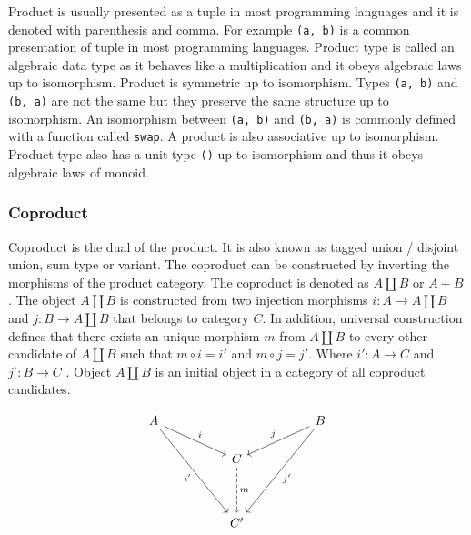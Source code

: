\documentclass[article]{aaltoseries}
\begin{document}
    Product is usually presented as a tuple in most programming languages and it
    is denoted with parenthesis and comma. For example \lstinline|(a, b)| is a
    common presentation of tuple in most programming languages. Product type is
    called an algebraic data type as it behaves like a multiplication and it
    obeys algebraic laws up to isomorphism. Product is symmetric up to
    isomorphism. Types \lstinline|(a, b)| and \lstinline|(b, a)| are not the
    same but they preserve the same structure up to isomorphism. An isomorphism
    between \lstinline|(a, b)| and \lstinline|(b, a)| is commonly defined with a
    function called \lstinline|swap|. A product is also associative up to
    isomorphism. Product type also has a unit type \lstinline|()| up to
    isomorphism and thus it obeys algebraic laws of monoid.


  \subsubsection{Coproduct}
    Coproduct is the dual of the product. It is also known as tagged union /
    disjoint union, sum type or variant. The coproduct can be constructed by
    inverting the morphisms of the product category. The coproduct is denoted as
    $A \amalg B$ or $A + B$. The object $A \amalg B$ is constructed from two
    injection morphisms $i : A \rightarrow A \amalg B$ and $j : B \rightarrow A
    \amalg B$ that belongs to category $C$. In addition, universal construction
    defines that there exists an unique morphism $m$ from $A \amalg B$ to every
    other candidate of $A \amalg B$ such that $m \circ i = i'$ and $m \circ j =
    j'$. Where $i' : A \rightarrow C$ and $j' : B \rightarrow C$
    \cite{barr1990category, pierce1991basic}. Object $A \amalg B$ is an initial
    object in a category of all coproduct candidates.

    \begin{equation}
      \label{coproduct}
      \begin{tikzcd}[row sep=huge, column sep=huge]
        A \arrow[dr, "i"]
        \arrow[ddr, "i'"']
        &
        & B \arrow[dl, "j"']
        \arrow[ddl, "j'"] \\
        [-2em] & C \arrow[d, dashed, "m"]
        & \\
        & C'
        &
      \end{tikzcd}
    \end{equation}
\end{document}
